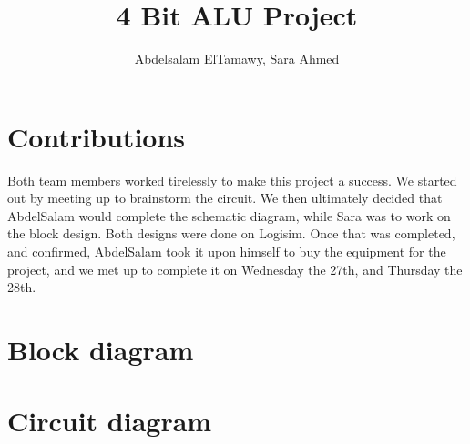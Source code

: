 \documentclass[12pt,a4paper]{article}
\author{Abdelsalam ElTamawy, Sara Ahmed}
\title{4 Bit ALU Project}
\begin{document}
\maketitle


\pagebreak

\section{Contributions}
Both team members worked tirelessly to make this project a success. We started out by meeting up to brainstorm the circuit. We then ultimately decided that AbdelSalam would complete the schematic diagram, while Sara was to work on the block design. Both designs were done on Logisim. Once that was completed, and confirmed, AbdelSalam took it upon himself to buy the equipment for the project, and we met up to complete it on Wednesday the 27th, and Thursday the 28th.
\section{Block diagram}

\noindent{}


\section{Circuit diagram}

\noindent{}
\end{document}
